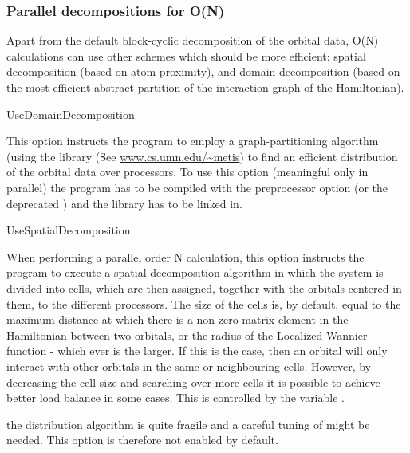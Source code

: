 \subsubsection{Parallel decompositions for O(N)}
\label{parallel-on}

Apart from the default block-cyclic decomposition of the orbital data,
O(N) calculations can use other schemes which should be more
efficient: spatial decomposition (based on atom proximity), and domain
decomposition (based on the most efficient abstract partition of the
interaction graph of the Hamiltonian). 


\begin{fdflogicalF}{UseDomainDecomposition}
  
  This option instructs the program to employ a graph-partitioning
  algorithm (using the  library (See
  \url{www.cs.umn.edu/~metis}) to find an efficient distribution of
  the orbital data over processors.  To use this option (meaningful
  only in parallel) the program has to be compiled with the
  preprocessor option  (or the deprecated
  ) and the  library has to
  be linked in.

\end{fdflogicalF}

\begin{fdflogicalF}{UseSpatialDecomposition}

  When performing a parallel order N calculation, this option
  instructs the program to execute a spatial decomposition algorithm
  in which the system is divided into cells, which are then assigned,
  together with the orbitals centered in them, to the different
  processors. The size of the cells is, by default, equal to the
  maximum distance at which there is a non-zero matrix element in the
  Hamiltonian between two orbitals, or the radius of the Localized
  Wannier function - which ever is the larger. If this is the case,
  then an orbital will only interact with other orbitals in the same
  or neighbouring cells. However, by decreasing the cell size and
  searching over more cells it is possible to achieve better load
  balance in some cases. This is controlled by the variable
  .

  \note the distribution algorithm is quite fragile and a careful
  tuning of  might be needed. This option is therefore
  not enabled by default.

\end{fdflogicalF}

